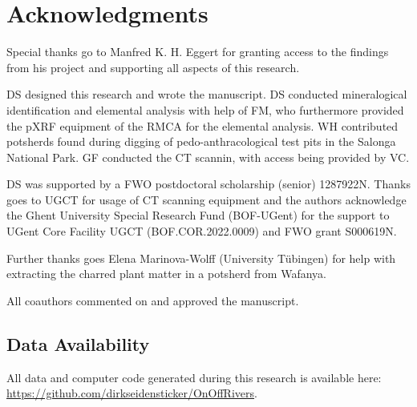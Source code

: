 \documentclass[preprint,10pt,oneside,onecolumn,authoryear]{elsarticle}
\begin{document}
\section{Acknowledgments}

Special thanks go to Manfred K. H. Eggert for granting access to the findings from his project and supporting all aspects of this research.

DS designed this research and wrote the manuscript. DS conducted mineralogical identification and elemental analysis with help of FM, who furthermore provided the pXRF equipment of the RMCA for the elemental analysis. WH contributed potsherds found during digging of pedo-anthra\-cological test pits in the Salonga National Park. GF conducted the {\textmu}CT scannin, with access being provided by VC.

DS was supported by a FWO postdoctoral scholarship (senior) 1287922N. Thanks goes to UGCT for usage of {\textmu}CT scanning equipment and the authors acknowledge the Ghent University Special Research Fund (BOF-UGent) for the support to UGent Core Facility UGCT (BOF.COR.2022.0009) and FWO grant S000619N.

Further thanks goes Elena Marinova-Wolff (University Tübingen) for help with extracting the charred plant matter in a potsherd from Wafanya.

All coauthors commented on and approved the manuscript.

\subsection{Data Availability}

All data and computer code generated during this research is available here: \url{https://github.com/dirkseidensticker/OnOffRivers}.


%

\end{document}
